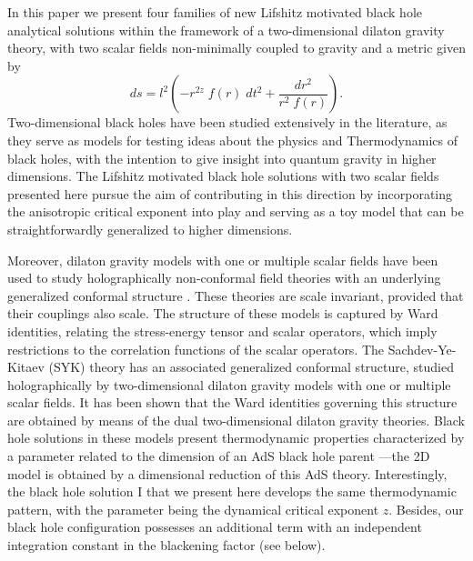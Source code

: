 \documentclass[sn-mathphys,Numbered]{sn-jnl}%
\theoremstyle{thmstyleone}%
\theoremstyle{thmstyletwo}%
\theoremstyle{thmstylethree}%
\begin{document}
    In this paper we present four families of new Lifshitz motivated black hole analytical solutions within the framework of a two-dimensional dilaton gravity theory, with two scalar fields non-minimally coupled to gravity and a metric given by
%
\begin{equation} \label{ansatz}
    ds=l^2 \left(-r^{2z}\;f(r)\;dt^{2}+\frac{dr^2}{r^2\;f(r)}\right).
\end{equation}
Two-dimensional black holes have been studied extensively in the literature, as they serve as models for testing ideas about the physics and Thermodynamics of black holes, with the intention to give insight into quantum gravity in higher dimensions. The Lifshitz motivated black hole solutions with two scalar fields presented here pursue the aim of contributing in this direction by incorporating the anisotropic critical exponent into play 
and serving as a toy model that can be straightforwardly generalized to higher dimensions.

Moreover, dilaton gravity models with one or multiple scalar fields have been used to study holographically non-conformal field theories with an underlying generalized conformal structure \cite{Marika syk}. These theories are scale invariant, provided that their couplings also scale. The structure of these models is captured by Ward identities, relating the stress-energy tensor and scalar operators, which imply restrictions to the correlation functions of the scalar operators. The Sachdev-Ye-Kitaev (SYK) theory has an associated generalized conformal structure, studied holographically by two-dimensional dilaton gravity models with one or multiple scalar fields. It has been shown that the Ward identities governing this structure are obtained by means of the dual two-dimensional dilaton gravity theories. Black hole solutions in these models present thermodynamic properties characterized by a parameter related to the dimension of an AdS black hole parent —the 2D model is obtained by a dimensional reduction of this AdS theory. Interestingly, the black hole solution I that we present here develops the same thermodynamic pattern, with the parameter being the dynamical critical exponent $z$. Besides, our black hole configuration possesses an additional term with an independent integration constant in the blackening factor (see below).
\end{document}
